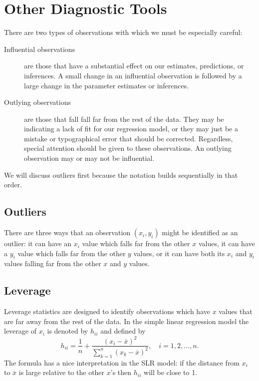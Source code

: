 \documentclass[captions=tableheading]{scrbook}
\begin{document}
\section{Other Diagnostic Tools}
\label{sec-11-5}

\label{sec:Other-Diagnostic-Tools-SLR}

There are two types of observations with which we must be especially careful:
\begin{description}
\item[Influential observations] are those that have a substantial effect on our estimates, predictions, or inferences. A small change in an influential observation is followed by a large change in the parameter estimates or inferences.
\item[Outlying observations] are those that fall fall far from the rest of the data. They may be indicating a lack of fit for our regression model, or they may just be a mistake or typographical error that should be corrected. Regardless, special attention should be given to these observations. An outlying observation may or may not be influential.
\end{description}

We will discuss outliers first because the notation builds sequentially in that order.
\subsection{Outliers}
\label{sec-11-5-1}

There are three ways that an observation \((x_{i},y_{i})\) might be identified as an  outlier: it can have an \(x_{i}\) value which falls far from the other  \(x\) values, it can have a \(y_{i}\) value which falls far from the other \(y\) values, or it can have both its \(x_{i}\) and \(y_{i}\) values falling far from the other \(x\) and \(y\) values.
\subsection{Leverage}
\label{sec-11-5-2}

Leverage statistics are designed to identify observations which have \(x\) values that are far away from the rest of the data. In the simple linear regression model the leverage of \(x_{i}\) is denoted by \(h_{ii}\) and defined by 
\begin{equation}
h_{ii}=\frac{1}{n}+\frac{(x_{i}-\overline{x})^{2}}{\sum_{k=1}^{n}(x_{k}-\overline{x})^{2}},\quad i=1,2,\ldots,n.
\end{equation}
The formula has a nice interpretation in the SLR model: if the distance from \(x_{i}\) to \(\overline{x}\) is large relative to the other \(x\)'s then \(h_{ii}\) will be close to 1. 
\end{document}
